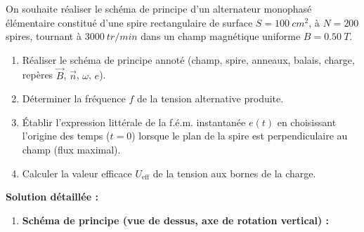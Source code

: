 \documentclass[11pt]{article}
\begin{document}
\begin{exoresolu}
On souhaite réaliser le schéma de principe d'un alternateur monophasé élémentaire constitué d'une spire rectangulaire de surface $S = \SI{100}{cm^2}$, à $N = 200$ spires, tournant à $\SI{3000}{tr/min}$ dans un champ magnétique uniforme $B = \SI{0,50}{T}$.
\begin{enumerate}
    \item Réaliser le schéma de principe annoté (champ, spire, anneaux, balais, charge, repères $\vec{B}$, $\vec{n}$, $\omega$, $e$).
    \item Déterminer la fréquence $f$ de la tension alternative produite.
    \item Établir l'expression littérale de la f.é.m. instantanée $e(t)$ en choisissant l'origine des temps ($t=0$) lorsque le plan de la spire est perpendiculaire au champ (flux maximal).
    \item Calculer la valeur efficace $U_{\text{eff}}$ de la tension aux bornes de la charge.
\end{enumerate}
\tcblower
\textbf{Solution détaillée :}
\begin{enumerate}
    \item \textbf{Schéma de principe (vue de dessus, axe de rotation vertical) :}
    \begin{popfigure}
\end{popfigure}
\end{enumerate}
\end{exoresolu}
\end{document}

